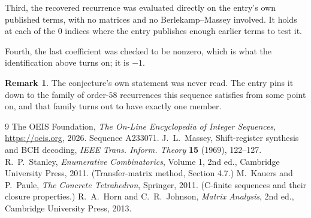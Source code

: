 \documentclass[11pt,a4paper]{article}
\theoremstyle{plain}
\theoremstyle{definition}
\newtheorem{remark}[theorem]{Remark}
\begin{document}
Third, the recovered recurrence was evaluated directly on the entry's own published terms, with
no matrices and no Berlekamp--Massey involved. It holds at each of the $0$ indices where
the entry publishes enough earlier terms to test it.

Fourth, the last coefficient was checked to be nonzero, which is what the identification above
turns on; it is $-1$.

\begin{remark}
The conjecture's own statement was never read. The entry pins it down to the family of
order-$58$ recurrences this sequence satisfies from some point on, and that family turns
out to have exactly one member.
\end{remark}

\begin{thebibliography}{9}
 The OEIS Foundation, \emph{The On-Line Encyclopedia of Integer
Sequences}, \url{https://oeis.org}, 2026. Sequence A233071.
 J.~L.~Massey, Shift-register synthesis and BCH decoding, \emph{IEEE
Trans. Inform. Theory} \textbf{15} (1969), 122--127.
 R.~P.~Stanley, \emph{Enumerative Combinatorics}, Volume 1, 2nd ed.,
Cambridge University Press, 2011. (Transfer-matrix method, Section 4.7.)
 M.~Kauers and P.~Paule, \emph{The Concrete Tetrahedron}, Springer, 2011.
(C-finite sequences and their closure properties.)
 R.~A.~Horn and C.~R.~Johnson, \emph{Matrix Analysis}, 2nd ed., Cambridge
University Press, 2013.
\end{thebibliography}
\end{document}
